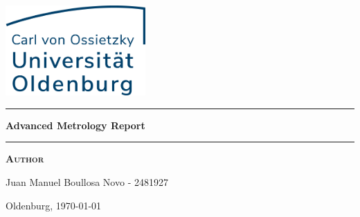 
\begin{titlepage}
\begin{center}
\vspace{2cm}
\includegraphics[width=0.4\textwidth]{root/logo.png}~\\[1cm]
\vspace{2cm}

\vspace{2cm}

\hrule
\vspace{.5cm}
{ \huge \bfseries Advanced Metrology Report} %
\vspace{.5cm}

\hrule
\vspace{1.5cm}

\textsc{\textbf{Author}}\\
\vspace{.5cm}
\centering

Juan Manuel Boullosa Novo - 2481927\\

\vspace{4cm}

\centering Oldenburg, \today %
\end{center}
\end{titlepage}